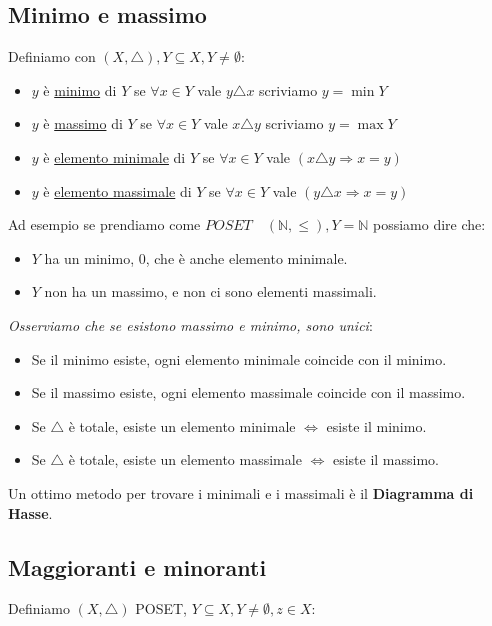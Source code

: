 \documentclass{article}
\theoremstyle{definition}
\begin{document}
\subsection{Minimo e massimo}\label{sec:minimo_e_massimo}
Definiamo con $(X, \triangle), Y \subseteq X, Y \not = \emptyset$:
\begin{itemize}
        \item $y$ è \underline{minimo} di $Y$ se $\forall x \in Y$  vale $y \triangle x$ scriviamo $y = \min Y$
        \item $y$ è \underline{massimo} di $Y$ se $\forall x \in Y$  vale $x \triangle y$ scriviamo $y = \max Y$
        \item $y$ è \underline{elemento minimale} di $Y$ se $\forall x \in Y$  vale $(x \triangle y \Rightarrow x = y)$
        \item $y$ è \underline{elemento massimale} di $Y$ se $\forall x \in Y$  vale $(y \triangle x \Rightarrow x = y)$
\end{itemize}

Ad esempio se prendiamo come $POSET \quad (\mathbb{N}, \le), Y = \mathbb{N}$ possiamo dire che:
\begin{itemize}
        \item $Y$ ha un minimo, $0$, che è anche elemento minimale.
        \item $Y$ non ha un massimo, e non ci sono elementi massimali. 
\end{itemize}

\textit{Osserviamo che se esistono massimo e minimo, sono unici}:
\begin{itemize}
        \item Se il minimo esiste, ogni elemento minimale coincide con il minimo.
        \item Se il massimo esiste, ogni elemento massimale coincide con il massimo.
        \item Se $\triangle$ è totale, esiste un elemento minimale $\Leftrightarrow$ esiste il minimo.
        \item Se $\triangle$ è totale, esiste un elemento massimale $\Leftrightarrow$ esiste il massimo. 
\end{itemize}

Un ottimo metodo per trovare i minimali e i massimali è il \textbf{Diagramma di Hasse}. \par



\subsection{Maggioranti e minoranti}\label{sec:maggioranti_e_minoranti}
Definiamo $(X, \triangle)$ POSET, $Y \subseteq X, Y \not = \emptyset, z \in X$:
\end{document}
